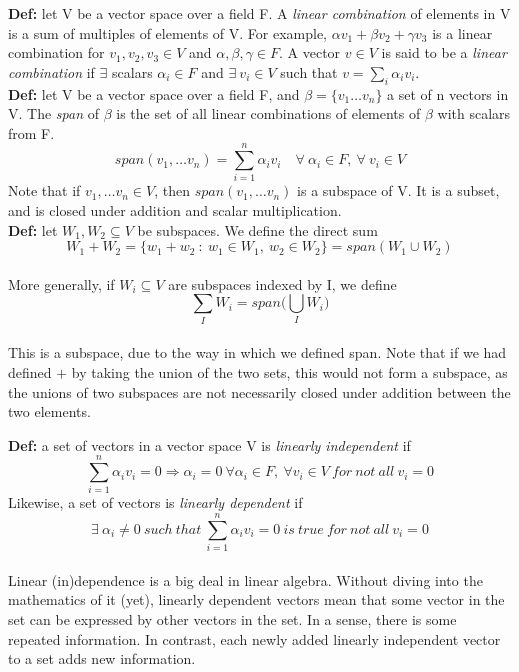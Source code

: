 \documentclass[12pt]{article}
\begin{document}
\textbf{Def: }let V be a vector space over a field F. A \emph{linear combination} of elements in V is a sum of multiples of elements of V. For example, $\alpha v_1 + \beta v_2 + \gamma v_3$ is a linear combination for $v_1,v_2,v_3 \in V$ and $\alpha, \beta, \gamma \in F$. A vector $v \in V$ is said to be a \emph{linear combination} if $\exists$ scalars $\alpha_i \in F$ and $\exists\ v_i \in V$ such that $v = \sum_{i}^{}\alpha_i v_i$.\\

\textbf{Def: }let V be a vector space over a field F, and $\beta =  \{ v_1 \dots v_n  \}$ a set of n vectors in V. The \emph{span} of $\beta$ is the set of all linear combinations of elements of $\beta$ with scalars from F.
$$span(v_1,\dots v_n) = \sum_{i = 1}^{n}\alpha_i v_i \quad \forall\ \alpha_i \in F,\ \forall\ v_i \in V$$
Note that if $v_1,\dots v_n \in V$, then $span(v_1,\dots v_n)$ is a subspace of V. It is a subset, and is closed under addition and scalar multiplication.\\

\textbf{Def: }let $W_1, W_2 \subseteq V$ be subspaces. We define the direct sum $$W_1 + W_2 = \{ w_1 + w_2\ :\ w_1 \in W_1,\ w_2 \in W_2 \} = span(W_1 \cup W_2)$$\\
More generally, if $W_i \subseteq V$ are subspaces indexed by I, we define$$\sum_{I}W_i = span\Bigg(\bigcup_{I}W_i \Bigg)$$\\
This is a subspace, due to the way in which we defined span. Note that if we had defined $+$ by taking the union of the two sets, this would not form a subspace, as the unions of two subspaces are not necessarily closed under addition between the two elements.

\textbf{Def: }a set of vectors in a vector space V is \emph{linearly independent} if $$\sum_{i = 1}^{n}\alpha_i v_i = 0 \Rightarrow \alpha_i = 0\ \forall \alpha_i \in F,\ \forall v_i \in V\ for\ not\ all\ v_i = 0$$
Likewise, a set of vectors is \emph{linearly dependent} if $$\exists\ \alpha_i \neq 0\ such\ that\ \sum_{i = 1}^{n}\alpha_i v_i = 0\ is\ true\ for\ not\ all\ v_i = 0$$\\
Linear (in)dependence is a big deal in linear algebra. Without diving into the mathematics of it (yet), linearly dependent vectors mean that some vector in the set can be expressed by other vectors in the set. In a sense, there is some repeated information. In contrast, each newly added linearly independent vector to a set adds new information.\\
\end{document}
